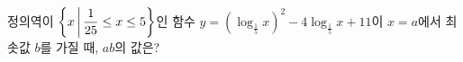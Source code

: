 정의역이 $\left\{x \mkern3mu \middle|\mkern3mu  \dfrac{1}{25}\le x\le 5\right\}$인 함수 $y=\left(\log_{\frac{1}{5}} x\right)^{2}-4\log_{\frac{1}{5}} x+11$이 $x=a$에서 최솟값 $b$를 가질 때, $ab$의 값은?

